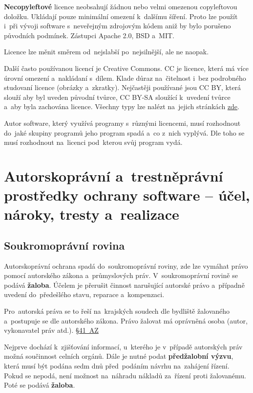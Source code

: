 \textbf{Necopyleftové} licence neobsahují žádnou nebo velmi omezenou copyleftovou doložku. Ukládají pouze minimální omezení k~dalšímu šíření. Proto lze použít i~při vývoji software s~neveřejným zdrojovým kódem aniž by bylo porušeno původních podmínek. Zástupci Apache 2.0, BSD a~MIT.

Licence lze měnit směrem od~nejslabší po~nejsilnější, ale ne naopak.

Další často používanou licencí je Creative Commons. CC je licence, která má více úrovní omezení a~nakládaní s~dílem. Klade důraz na~čitelnost i~bez podrobného studovaní licence (obrázky a~zkratky). Nejčastěji používané jsou CC BY, která slouží aby byl uveden původní tvůrce, CC BY-SA sloužící k~uvedení tvůrce a~aby byla zachována licence. Všechny typy lze nalézt na~jejich stránkách \href{https://creativecommons.org/licenses/}{zde}.

Autor software, který využívá programy s~různými licencemi, musí rozhodnout do~jaké skupiny programů jeho program spadá a~co z~nich vyplývá. Dle toho se musí rozhodnout na~licenci pod~kterou svůj program vydá.

\clearpage
\section{Autorskoprávní a~trestněprávní prostředky ochrany software -- účel, nároky, tresty a~realizace}

\subsection{Soukromoprávní rovina}

Autorskoprávní ochrana spadá do~soukromoprávní roviny, zde lze vymáhat právo pomocí autorského zákona a~průmyslových práv. V~soukromoprávní rovině se podává \textbf{žaloba}. Účelem je přerušit činnost  narušující autorské právo a~případně uvedení do~předešlého stavu, reparace a~kompenzaci.

Pro~autorská práva se to řeší na~krajských soudech dle bydliště žalovaného a~postupuje se dle autorského zákona. Právo žalovat má oprávněná osoba (autor, vykonavatel práv atd.). \href{https://www.zakonyprolidi.cz/cs/2000-121#p41}{§41~AZ}

Nejprve dochází k~zjišťování informací, u~kterého je v~případě autorských práv možná součinnost celních orgánů. Dále je nutné podat \textbf{předžalobní výzvu}, která musí být podána sedm dnů před~podáním návrhu na~zahájení řízení. Pokud se nepodá, není možnost na~náhradu nákladů za~řízení proti žalovanému. Poté se podává \textbf{žaloba}.

